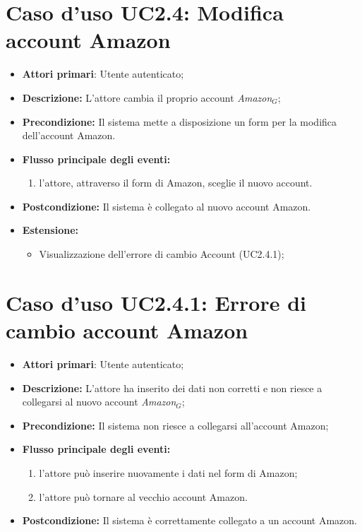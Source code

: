 		\section{Caso d'uso UC2.4: Modifica account Amazon }
		\begin{itemize}
			\item \textbf{Attori primari}: Utente autenticato;
			\item \textbf{Descrizione:} L'attore cambia il proprio account \textit{Amazon$_{G}$};
			\item \textbf{Precondizione:} Il sistema mette a disposizione un form per la modifica dell'account Amazon.
			\item \textbf{Flusso principale degli eventi:}
			\begin{enumerate}
				\item l'attore, attraverso il form di Amazon, sceglie il nuovo account.
			\end{enumerate}
			\item \textbf{Postcondizione:} Il sistema è collegato al nuovo account Amazon.
			\item \textbf{Estensione:}
			\begin{itemize}
				\item Visualizzazione dell'errore di cambio Account (UC2.4.1);
			\end{itemize}
		\end{itemize}
		\section{Caso d'uso UC2.4.1: Errore di cambio account Amazon }
		\begin{itemize}
			\item \textbf{Attori primari}: Utente autenticato;
			\item \textbf{Descrizione:} L'attore ha inserito dei dati non corretti e non riesce a collegarsi al nuovo account \textit{Amazon$_{G}$};
			\item \textbf{Precondizione:} Il sistema non riesce a collegarsi all'account Amazon;
			\item \textbf{Flusso principale degli eventi:}
			\begin{enumerate}
				\item l'attore può inserire nuovamente i dati nel form di Amazon;
				\item l'attore può tornare al vecchio account Amazon.
			\end{enumerate}
			\item \textbf{Postcondizione:} Il sistema è correttamente collegato a un account Amazon.
		\end{itemize}
